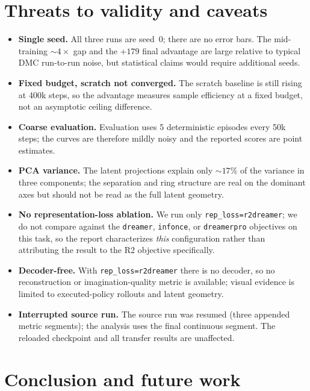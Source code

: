 \documentclass[11pt]{article}
\begin{document}
\section{Threats to validity and caveats}
\label{sec:caveats}

\begin{itemize}
\item \textbf{Single seed.} All three runs are seed~0; there are no error bars.
      The mid-training $\sim\!4\times$ gap and the $+179$ final advantage are
      large relative to typical DMC run-to-run noise, but statistical claims
      would require additional seeds.
\item \textbf{Fixed budget, scratch not converged.} The scratch baseline is
      still rising at 400k steps, so the advantage measures sample efficiency at
      a fixed budget, not an asymptotic ceiling difference.
\item \textbf{Coarse evaluation.} Evaluation uses 5 deterministic episodes every
      50k steps; the curves are therefore mildly noisy and the reported scores
      are point estimates.
\item \textbf{PCA variance.} The latent projections explain only $\sim\!17\%$ of
      the variance in three components; the separation and ring structure are
      real on the dominant axes but should not be read as the full latent
      geometry.
\item \textbf{No representation-loss ablation.} We run only
      \texttt{rep\_loss=r2dreamer}; we do not compare against the
      \texttt{dreamer}, \texttt{infonce}, or \texttt{dreamerpro} objectives on
      this task, so the report characterizes \emph{this} configuration rather
      than attributing the result to the R2 objective specifically.
\item \textbf{Decoder-free.} With \texttt{rep\_loss=r2dreamer} there is no
      decoder, so no reconstruction or imagination-quality metric is
      available; visual evidence is limited to executed-policy rollouts and latent
      geometry.
\item \textbf{Interrupted source run.} The source run was resumed
      (three appended metric segments); the analysis uses the final continuous
      segment. The reloaded checkpoint and all transfer results are unaffected.
\end{itemize}

\section{Conclusion and future work}
\end{document}
